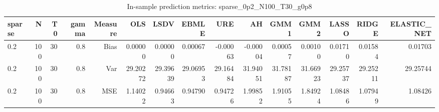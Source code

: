 \begin{table}[!htbp]\centering
\caption{In-sample prediction metrics: sparse_0p2_N100_T30_g0p8}
\label{tab:table2_sparse_0p2_N100_T30_g0p8}
\begin{tabular}{lrrrrrrrrrrrrrr}
\hline
sparse & N & T0 & gamma & Measure & OLS & LSDV & EBMLE & URE & AH & GMM1 & GMM2 & LASSO & RIDGE & ELASTIC_NET \\
\hline
0.2 & 100 & 30 & 0.8 & Bias & 0.00000 & 0.00000 & 0.00067 & -0.00063 & -0.00004 & 0.00057 & 0.00100 & 0.01710 & 0.01584 & 0.01703 \\
0.2 & 100 & 30 & 0.8 & Var & 29.20272 & 29.39639 & 29.06953 & 29.16484 & 31.94051 & 31.78187 & 31.66923 & 29.25737 & 29.25211 & 29.25744 \\
0.2 & 100 & 30 & 0.8 & MSE & 1.14022 & 0.94663 & 0.94790 & 0.94726 & 1.99852 & 1.91055 & 1.84924 & 1.08486 & 1.07949 & 1.08426 \\
\hline
\end{tabular}
\end{table}

